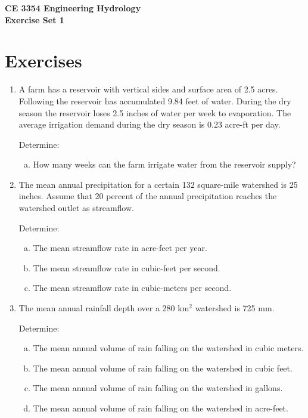 \documentclass[12pt]{article}
\begin{document}
\begin{center}
{\textbf{{ CE 3354 Engineering Hydrology} \\ {Exercise Set 1}}}
\end{center}

\section*{\small{Exercises}}
\begin{enumerate}
\item A farm has a reservoir with vertical sides and surface area of 2.5 acres. Following the reservoir has accumulated 9.84 feet of water.  During the dry season the reservoir loses 2.5 inches of water per week to evaporation.  The average irrigation demand during the dry season is 0.23 acre-ft per day.

Determine:
    \begin{enumerate}[a)]
        \item How many weeks can the farm irrigate water from the reservoir supply? 
    \end{enumerate}

\clearpage

\item The mean annual precipitation for a certain 132 square-mile watershed is 25 inches. Assume that 20 percent of the annual precipitation reaches the watershed outlet as streamflow.

Determine:
    \begin{enumerate}[a)]
        \item The mean streamflow rate in acre-feet per year. 
        \item The mean streamflow rate in cubic-feet per second.
        \item The mean streamflow rate in cubic-meters per second.
    \end{enumerate}

\clearpage
\item The mean annual rainfall depth over a 280 km$^2$ watershed is 725 mm.

Determine:
    \begin{enumerate}[a)]
        \item The mean annual volume of rain falling on the watershed in cubic meters. 
        \item The mean annual volume of rain falling on the watershed in cubic feet.
        \item The mean annual volume of rain falling on the watershed in gallons.
        \item The mean annual volume of rain falling on the watershed in acre-feet.
    \end{enumerate}


\end{enumerate}
\end{document}
